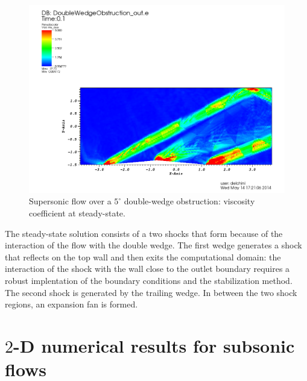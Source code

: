 %
        \begin{figure}[H]%
                \centering
                \includegraphics[width=\textwidth]{figures/DWOViscosityStt.png}
                \caption{Supersonic flow over a $5^\circ$ double-wedge obstruction: viscosity coefficient at steady-state.}
                \label{fig:2d_dbw_visc_stt}
        \end{figure}
The steady-state solution consists of a two shocks that form because of the interaction of the flow with the double wedge. The first wedge generates a shock that reflects on the top wall and then exits the computational domain: the interaction of the shock with the wall close to the outlet boundary requires a robust implentation of the boundary conditions and the stabilization method. The second shock is generated by the trailing wedge. In between the two shock regions, an expansion fan is formed. 
\section{$2$-D numerical results for subsonic flows} \label{sec:2d-susubsonic-results}
